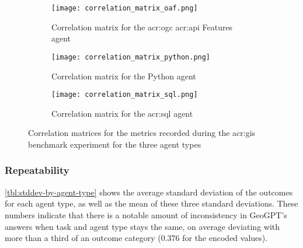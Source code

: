\begin{figure}[htp]
    \centering

    \begin{subfigure}[b]{\textwidth}
        \texttt{[image: correlation\_matrix\_oaf.png]}
        \caption{Correlation matrix for the \acrshort{acr:ogc} \acrshort{acr:api} Features agent}
        \label{fig:sub1}
    \end{subfigure}

    \vspace{1cm}

    \begin{subfigure}[b]{\textwidth}
        \texttt{[image: correlation\_matrix\_python.png]}
        \caption{Correlation matrix for the Python agent}
        \label{fig:sub2}
    \end{subfigure}

    \vspace{1cm}

    \begin{subfigure}[b]{\textwidth}
        \texttt{[image: correlation\_matrix\_sql.png]}
        \caption{Correlation matrix for the \acrshort{acr:sql} agent}
        \label{fig:sub3}
    \end{subfigure}

    \caption{Correlation matrices for the metrics recorded during the \acrshort{acr:gis} benchmark experiment for the three agent types}
    \label{fig:correlation-matrices}
\end{figure}

\subsubsection{Repeatability}

\autoref{tbl:stddev-by-agent-type} shows the average standard deviation of the outcomes for each agent type, as well as the mean of these three standard deviations. These numbers indicate that there is a notable amount of inconsistency in GeoGPT's answers when task and agent type stays the same, on average deviating with more than a third of an outcome category (0.376 for the encoded values).

